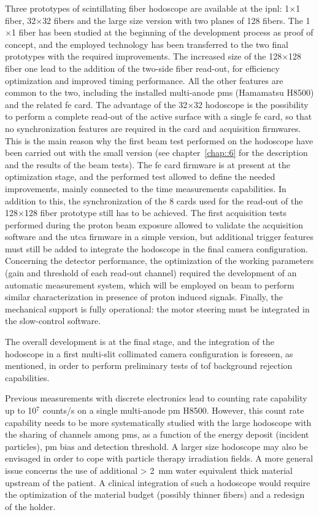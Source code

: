 Three prototypes of scintillating fiber hodoscope are available at the \gls{ipnl}: 1$\times$1 fiber, 32$\times$32 fibers and the large size version with two planes of 128 fibers. The 1$\times$1 fiber has been studied at the beginning of the development process as proof of concept, and the employed technology has been transferred to the two final prototypes with the required improvements. The increased size of the 128$\times$128 fiber one lead to the addition of the two-side fiber read-out, for efficiency optimization and improved timing performance. All the other features are common to the two, including the installed multi-anode \glspl{pm} (Hamamatsu H8500) and the related \gls{fe} card. The advantage of the 32$\times$32 hodoscope is the possibility to perform a complete read-out of the active surface with a single \gls{fe} card, so that no synchronization features are required in the card and acquisition firmwares. This is the main reason why the first beam test performed on the hodoscope have been carried out with the small version (see chapter~\ref{chap::6} for the description and the results of the beam tests). The \gls{fe} card firmware is at present at the optimization stage, and the performed test allowed to define the needed improvements, mainly connected to the time measurements capabilities. In addition to this, the synchronization of the 8 cards used for the read-out of the 128$\times$128 fiber prototype still has to be achieved. The first acquisition tests performed during the proton beam exposure allowed to validate the acquisition software and the \gls{utca} firmware in a simple version, but additional trigger features must still be added to integrate the hodoscope in the final camera configuration. Concerning the detector performance, the optimization of the working parameters (gain and threshold of each read-out channel) required the development of an automatic measurement system, which will be employed on beam to perform similar characterization in presence of proton induced signals. Finally, the mechanical support is fully operational: the motor steering must be integrated in the slow-control software.

The overall development is at the final stage, and the integration of the hodoscope in a first multi-slit collimated camera configuration is foreseen, as mentioned, in order to perform preliminary tests of \gls{tof} background rejection capabilities.

Previous measurements with discrete electronics lead to counting rate capability up to 10$^7$ counts/s on a single multi-anode \gls{pm} H8500. However, this count rate capability needs to be more systematically studied with the large hodoscope with the sharing of channels among \glspl{pm}, as a function of the energy deposit (incident particles), \gls{pm} bias and detection threshold. A larger size hodoscope may also be envisaged in order to cope with particle therapy irradiation fields. A more general issue concerns the use of additional > 2~mm water equivalent thick material upstream of the patient. A clinical integration of such a hodoscope would require the optimization of the material budget (possibly thinner fibers) and a redesign of the holder.

